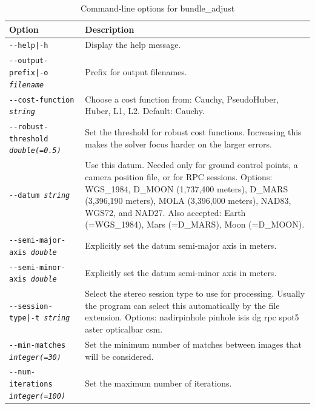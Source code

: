 \begin{longtable}{|p{8cm}|p{9cm}|}
\caption{Command-line options for bundle\_adjust}
\label{tbl:bundleadjust}
\endfirsthead
\endhead
\endfoot
\endlastfoot
\hline
Option & Description \\ \hline \hline
\texttt{-\/-help|-h} & Display the help message. \\ \hline

\texttt{-\/-output-prefix|-o \textit{filename}} & Prefix for output filenames. \\ \hline

\texttt{-\/-cost-function \textit{string}} & Choose a cost function
from: Cauchy, PseudoHuber, Huber, L1, L2. Default: Cauchy. \\ \hline

\texttt{-\/-robust-threshold \textit{double(=0.5)}} & Set the threshold for robust
cost functions.  Increasing this makes the solver focus harder on the larger errors.\\ \hline

\texttt{-\/-datum \textit{string}} & 
Use this datum. Needed only for ground control points, a camera position file, or for RPC sessions. Options: WGS\_1984, D\_MOON (1,737,400 meters), D\_MARS (3,396,190 meters), MOLA (3,396,000 meters), NAD83, WGS72, and NAD27. Also accepted: Earth (=WGS\_1984), Mars (=D\_MARS), Moon (=D\_MOON). \\ \hline

\texttt{-\/-semi-major-axis \textit{double}} & Explicitly set the datum semi-major axis
in meters.\\ \hline
\texttt{-\/-semi-minor-axis \textit{double}} & Explicitly set the datum semi-minor axis
in meters.\\ \hline

\texttt{-\/-session-type|-t \textit{string}} & Select the stereo
session type to use for processing. Usually the program can select this
automatically by the file extension. Options: nadirpinhole pinhole isis dg rpc spot5 aster opticalbar csm. \\ \hline

\texttt{-\/-min-matches \textit{integer(=30)}} & Set the minimum number of matches
between images that will be considered. \\ \hline

\texttt{-\/-num-iterations \textit{integer(=100)}} & Set the maximum
number of iterations. \\ \hline


\end{longtable}
